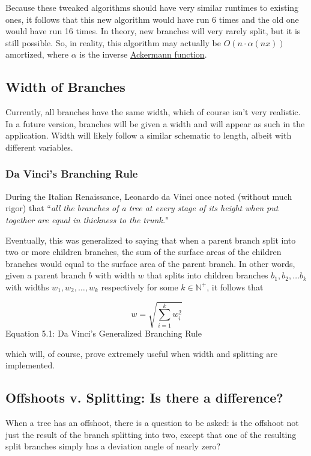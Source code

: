 Because these tweaked algorithms should have very similar runtimes to existing ones, it follows that this new algorithm would have run 6 times and the old one would have run 16 times. In theory, new branches will very rarely split, but it is still possible. So, in reality, this algorithm may actually be $O(n \cdot \alpha(nx) )$ amortized, where $\alpha$ is the inverse \href{https://en.wikipedia.org/wiki/Ackermann_function}{Ackermann function}.

\subsection{Width of Branches}

Currently, all branches have the same width, which of course isn't very realistic. In a future version, branches will be given a width and will appear as such in the application. Width will likely follow a similar schematic to length, albeit with different variables.

\subsubsection{Da Vinci's Branching Rule}

During the Italian Renaissance, Leonardo da Vinci once noted (without much rigor) that ``\textit{all the branches of a tree at every stage of its height when put together are equal in thickness to the trunk.}"

Eventually, this was generalized to saying that when a parent branch split into two or more children branches, the sum of the surface areas of the children branches would equal to the surface area of the parent branch. In other words, given a parent branch $b$ with width $w$ that splits into children branches $b_1, b_2, \dots b_k$ with widths $w_1, w_2, \dots, w_k$ respectively for some $k \in \mathbb{N}^+$, it follows that

$$w = \sqrt{\sum_{i=1}^k w_i^2}$$
\centering Equation 5.1: Da Vinci's Generalized Branching Rule

\medskip\justifying
\setlength{\parindent}{0pt}
\setlength{\parskip}{8pt}
which will, of course, prove extremely useful when width and splitting are implemented.

\subsection{Offshoots v. Splitting: Is there a difference?}

When a tree has an offshoot, there is a question to be asked: is the offshoot not just the result of the branch splitting into two, except that one of the resulting split branches simply has a deviation angle of nearly zero?


